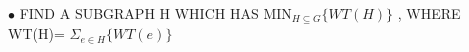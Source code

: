 \documentclass[preview]{standalone}
\begin{document}
\begin{center}
$\bullet$ FIND     A     SUBGRAPH     H    WHICH     HAS   $\text{MIN}_{\scriptscriptstyle   H \subseteq G} \{ WT(H) \}$ ,    WHERE     WT(H)= $\Sigma_{e \in H} \{ WT(e) \}$
\end{center}
\end{document}

